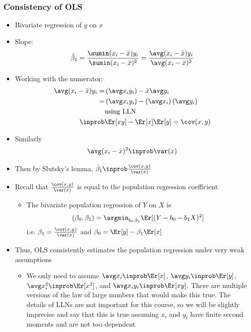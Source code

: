 \begin{frame}[allowframebreaks]
  \frametitle{Consistency of OLS}
  \begin{itemize}
  \item Bivariate regression of $y$ on $x$
  \item Slope:
    \[ \hat{\beta}_1 = \frac{\sumin (x_i - \bar{x}) y_i }
    {\sumin (x_i  - \bar{x})^2} 
    = \frac{\avg (x_i - \bar{x}) y_i }
    {\avg (x_i  - \bar{x})^2}  \]
  \item Working with the numerator:
    \begin{align*}
      \avg (x_i - \bar{x}) y_i = & \left( \avg x_i y_i \right) - \bar{x} \avg y_i \\
      = &\left( \avg x_i y_i \right) - \left(\avg x_i \right)
      \left(\avg y_i \right) \\
      & \text{using LLN} \\
      \inprob & \Er[xy] - \Er[x]\Er[y] = \cov(x,y) 
    \end{align*}
  \item Similarly
    \[ {\avg (x_i  - \bar{x})^2} \inprob \var(x) \]
  \item Then by Slutsky's lemma, $\hat{\beta}_1 \inprob
    \frac{\cov(x,y)}{\var(x)}$
  \item Recall that $\frac{\cov(x,y)}{\var(x)}$ is equal to the
    population regression coefficient
    \begin{itemize}
    \item The bivariate \alert{population regression} of $Y$ on $X$ is 
      \[ (\beta_0, \beta_1) = \argmin_{b_0,b_1} \Er[(Y - b_0 - b_1
      X)^2 ] \] 
      i.e. $\beta_1 = \frac{\cov(x,y)}{\var(x)}$ and $\beta_0 = \Er[y]
      - \beta_1 \Er[x]$
    \end{itemize}
  \item Thus, OLS consistently estimates the population regression
    under very weak assumptions
    \begin{itemize}
    \item We only need to assume $\avg
      x_i \inprob \Er[x]$, $\avg y_i \inprob \Er[y]$, $\avg x_i^2
      \inprob \Er[x^2]$, and $\avg x_i y_i \inprob \Er[xy]$. There are
      multiple versions of the law of large numbers that would make
      this true. The details of LLNs are not important for this course,
      so we will be slightly imprecise and say that this is true
      assuming $x_i$ and $y_i$ have finite second moments and are not
      too dependent
    \end{itemize}
  \end{itemize}  


\end{frame}
